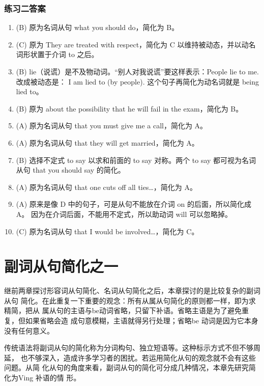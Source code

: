 \subsection{练习二答案}
\begin{enumerate}
\item (B) 原为名词从句 what you should do，简化为 B。

\item (C) 原为 They are treated with respect，简化为 C 以维持被动态，并以动名词形状置于介词 to 之后。
\item (B) lie（说谎）是不及物动词。“别人对我说谎”要这样表示：People lie to me. 改成被动态是： I am lied to (by people). 这个句子再简化为动名词就是 being lied to。

\item (B) 原为 about the possibility that he will fail in the exam，简化为 B。

\item (A) 原为名词从句 that you must give me a call，简化为 A。

\item (A) 原为名词从句 that they will get married，简化为 A。

\item (B) 选择不定式 to say 以求和前面的 to say 对称。两个 to say 都可视为名词从句 that you should say 的简化。

\item (A) 原为名词从句 that one cuts off all ties…，简化为 A。

\item (A) 原来是像 D 中的句子，可是从句不能放在介词 on 的后面，所以简化成 A。
  因为在介词后面，不能用不定式，所以助动词 will 可以忽略掉。

\item (C) 原为名词从句 that I would be involved…，简化为 C。
\end{enumerate}

\chapter{副词从句简化之一}

继前两章探讨形容词从句简化、名词从句简化之后，本章探讨的是比较复杂的副词从句
简化。在此重复一下重要的观念：所有从属从句简化的原则都一样，即为求精简，把从
属从句的主语与be动词省略，只留下补语。省略主语是为了避免重复，但如果省略会造
成句意模糊，主语就得另行处理；省略be 动词是因为它本身没有任何意义。

传统语法将副词从句的简化称为分词构句、独立短语等。这种标示方式不但不够周延，
也不够深入，造成许多学习者的困扰。若运用简化从句的观念就不会有这些问题。从简
化从句的角度来看，副词从句的简化可分成几种情况，本章先研究简化为Ving 补语的情
形。

